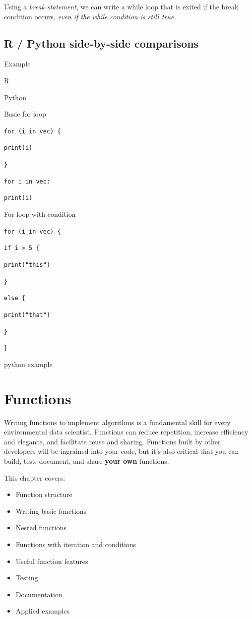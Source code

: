 \documentclass[
]{book}
\providecommand{\tightlist}{%
  \setlength{\itemsep}{0pt}\setlength{\parskip}{0pt}}
\begin{document}
Using a \emph{break statement}, we can write a while loop that is exited if the break condition occurs, \emph{even if the while condition is still true.}

\hypertarget{r-python-side-by-side-comparisons}{%
\section{R / Python side-by-side comparisons}\label{r-python-side-by-side-comparisons}}

Example

R

Python

Basic for loop

\texttt{for\ (i\ in\ vec)\ \{}

\texttt{print(i)}

\texttt{\}}

\texttt{for\ i\ in\ vec:}

\texttt{print(i)}

For loop with condition

\texttt{for\ (i\ in\ vec)\ \{}

\texttt{if\ i\ \textgreater{}\ 5\ \{}

\texttt{print("this")}

\texttt{\}}

\texttt{else\ \{}

\texttt{print("that")}

\texttt{\}}

\texttt{\}}

python example

\hypertarget{functions}{%
\chapter{Functions}\label{functions}}

Writing functions to implement algorithms is a fundamental skill for every environmental data scientist. Functions can reduce repetition, increase efficiency and elegance, and facilitate reuse and sharing. Functions built by other developers will be ingrained into your code, but it's also critical that you can build, test, document, and share \textbf{your own} functions.

This chapter covers:

\begin{itemize}
\tightlist
\item
  Function structure
\item
  Writing basic functions
\item
  Nested functions
\item
  Functions with iteration and conditions
\item
  Useful function features
\item
  Testing
\item
  Documentation
\item
  Applied examples
\end{itemize}
\end{document}
